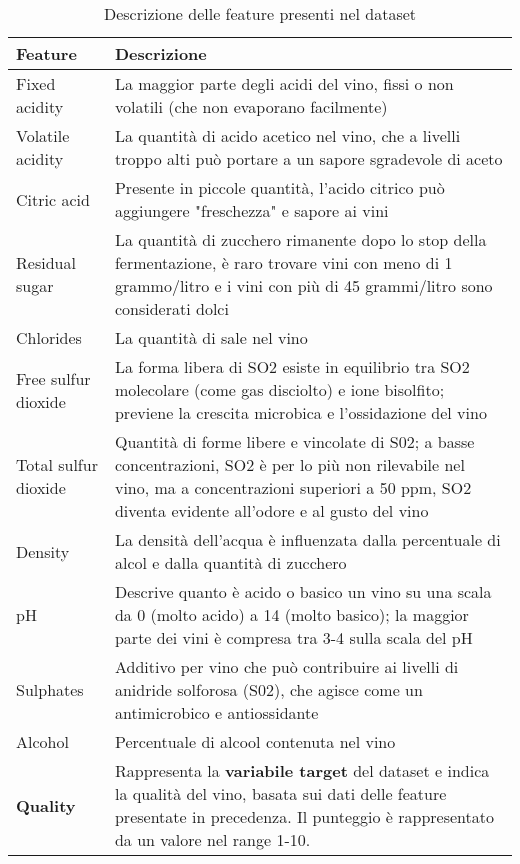        \begin{table}[h!]
        \begin{tabularx}{\textwidth}{|l|X|}
            \hline
             \textbf{Feature} & \textbf{Descrizione} \\ \hline
             Fixed acidity & La maggior parte degli acidi del vino, fissi o non volatili (che non evaporano facilmente) \\ \hline
             Volatile acidity & La quantità di acido acetico nel vino, che a livelli troppo alti può portare a un sapore sgradevole di aceto \\ \hline
             Citric acid & Presente in piccole quantità, l'acido citrico può aggiungere "freschezza" e sapore ai vini \\ \hline
             Residual sugar & La quantità di zucchero rimanente dopo lo stop della fermentazione, è raro trovare vini con meno di 1 grammo/litro e i vini con più di 45 grammi/litro sono considerati dolci \\ \hline 
             Chlorides & La quantità di sale nel vino\\ \hline
             Free sulfur dioxide & La forma libera di SO2 esiste in equilibrio tra SO2 molecolare (come gas disciolto) e ione bisolfito; previene la crescita microbica e l'ossidazione del vino \\ \hline
             Total sulfur dioxide & Quantità di forme libere e vincolate di S02; a basse concentrazioni, SO2 è per lo più non rilevabile nel vino, ma a concentrazioni superiori a 50 ppm, SO2 diventa evidente all'odore e al gusto del vino\\ \hline
             Density & La densità dell'acqua è influenzata dalla percentuale di alcol e dalla quantità di zucchero\\ \hline
             pH & Descrive quanto è acido o basico un vino su una scala da 0 (molto acido) a 14 (molto basico); la maggior parte dei vini è compresa tra 3-4 sulla scala del pH \\ \hline
             Sulphates & Additivo per vino che può contribuire ai livelli di anidride solforosa (S02), che agisce come un antimicrobico e antiossidante \\ \hline
             Alcohol & Percentuale di alcool contenuta nel vino\\ \hline
             \textbf{Quality} & Rappresenta la \textbf{variabile target} del dataset e indica la qualità del vino, basata sui dati delle feature presentate in precedenza. Il punteggio è rappresentato da un valore nel range 1-10. \\ 
             \hline
        \end{tabularx}
        \caption{Descrizione delle feature presenti nel dataset}
        \label{tab:features}
        \end{table}
        
        \clearpage